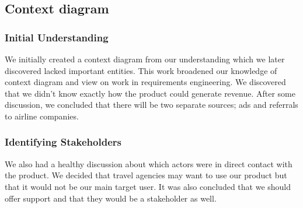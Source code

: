 


\subsection{Context diagram}

\subsubsection{Initial Understanding}
We initially created a context diagram from our understanding which we later discovered lacked important entities. This work broadened our knowledge of context diagram and view on work in requirements engineering. We discovered that we didn’t know exactly how the product could generate revenue. After some discussion, we concluded that there will be two separate sources; ads and referrals to airline companies.

\subsubsection{Identifying Stakeholders}
We also had a healthy discussion about which actors were in direct contact with the product. We decided that travel agencies may want to use our product but that it would not be our main target user. It was also concluded that we should offer support and that they would be a stakeholder as well. 

